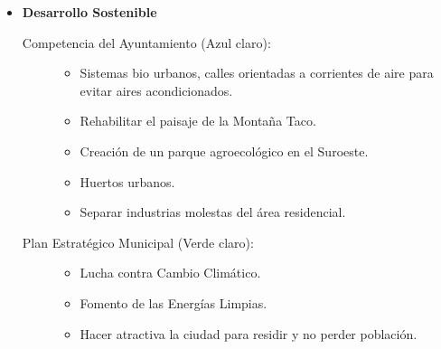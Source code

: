 \begin{itemize}
\begin{itemize}
        \item \textbf{Desarrollo Sostenible}
        \begin{description}
            \item[Competencia del Ayuntamiento (Azul claro):]
            \begin{itemize}
                \item Sistemas bio urbanos, calles orientadas a corrientes de aire para evitar aires acondicionados.
                \item Rehabilitar el paisaje de la Montaña Taco.
                \item Creación de un parque agroecológico en el Suroeste.
                \item Huertos urbanos.
                \item Separar industrias molestas del área residencial.
            \end{itemize}
            \item[Plan Estratégico Municipal (Verde claro):]
            \begin{itemize}
                \item Lucha contra Cambio Climático.
                \item Fomento de las Energías Limpias.
                \item Hacer atractiva la ciudad para residir y no perder población.
            \end{itemize}
        \end{description}
    \end{itemize}
\end{itemize}